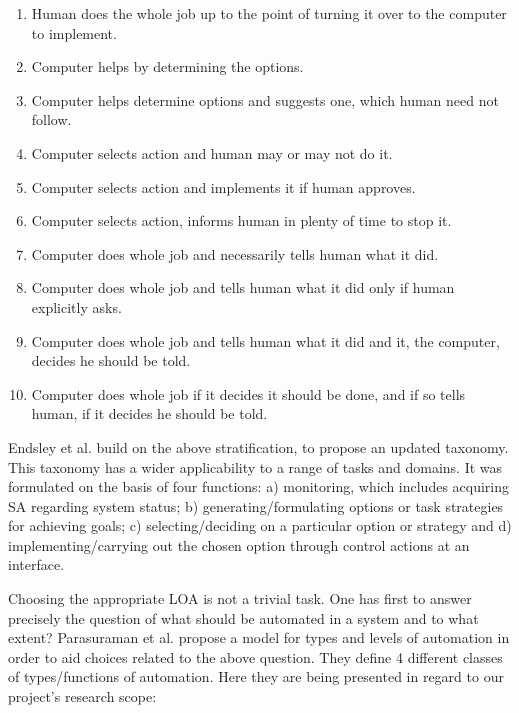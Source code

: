 \documentclass[a4paper,12pt,oneside,openright]{bhamthesis}
\begin{document}
\begin{enumerate}
	\item Human does the whole job up to the point of turning it over to the computer to implement.
	\item Computer helps by determining the options.
	\item Computer helps determine options and suggests one, which human need not follow.
	\item Computer selects action and human may or may not do it.
	\item Computer selects action and implements it if human approves.
	\item Computer selects action, informs human in plenty of time to stop it.
	\item Computer does whole job and necessarily tells human what it did.
	\item Computer does whole job and tells human what it did only if human explicitly asks.
	\item Computer does whole job and tells human what it did and it, the computer, decides he should be told.
	\item Computer does whole job if it decides it should be done, and if so tells human, if it decides he should be told.	
\end{enumerate}

Endsley et al. \citep{Endsley1999} build on the above stratification, to propose an updated taxonomy. This taxonomy has a wider applicability to a range of tasks and domains. It was formulated on the basis of four functions: a) monitoring, which includes acquiring SA regarding system status; b) generating/formulating options or task strategies for achieving goals; c) selecting/deciding on a particular option or strategy and d) implementing/carrying out the chosen option through control actions at an interface.

Choosing the appropriate LOA is not a trivial task. One has first to answer precisely the question of what should be automated in a system and to what extent? Parasuraman et al. \citep{Parasuraman2000} propose a model for types and levels of automation in order to aid choices related to the above question. They define 4 different classes of types/functions of automation. Here they are being presented in regard to our project's research scope:
\end{document}
